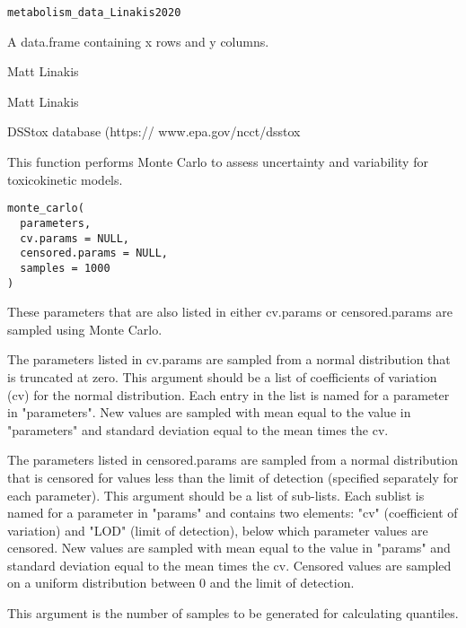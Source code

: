 \documentclass[a4paper]{book}
\begin{document}
%
\begin{Usage}
\begin{verbatim}
metabolism_data_Linakis2020
\end{verbatim}
\end{Usage}
%
\begin{Format}
A data.frame containing x rows and y columns.
\end{Format}
%
\begin{Author}\relax
Matt Linakis
\end{Author}
%
\begin{Source}\relax
Matt Linakis
\end{Source}
%
\begin{References}\relax
DSStox database (https:// www.epa.gov/ncct/dsstox
\end{References}
%
\begin{Description}\relax
This function performs Monte Carlo to assess uncertainty and variability for
toxicokinetic models.
\end{Description}
%
\begin{Usage}
\begin{verbatim}
monte_carlo(
  parameters,
  cv.params = NULL,
  censored.params = NULL,
  samples = 1000
)
\end{verbatim}
\end{Usage}
%
\begin{Arguments}
\begin{ldescription}
\item[\code{parameters}] These parameters that are also listed in either
cv.params or censored.params are sampled using Monte Carlo.

\item[\code{cv.params}] The parameters listed in cv.params are sampled from a
normal distribution that is truncated at zero. This argument should be a
list of coefficients of variation (cv) for the normal distribution. Each
entry in the list is named for a parameter in "parameters". New values are
sampled with mean equal to the value in "parameters" and standard deviation
equal to the mean times the cv.

\item[\code{censored.params}] The parameters listed in censored.params are sampled
from a normal distribution that is censored for values less than the limit
of detection (specified separately for each parameter). This argument should
be a list of sub-lists. Each sublist is named for a parameter in "params"
and contains two elements: "cv" (coefficient of variation) and "LOD" (limit
of detection), below which parameter values are censored. New values are
sampled with mean equal to the value in "params" and standard deviation
equal to the mean times the cv. Censored values are sampled on a uniform
distribution between 0 and the limit of detection.

\item[\code{samples}] This argument is the number of samples to be generated for
calculating quantiles.
\end{ldescription}
\end{Arguments}
\end{document}

